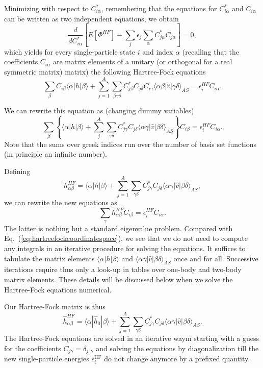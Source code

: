 \documentclass[graybox,sectrefs,envcountresetchap,open=right]{svmonodo}
\begin{document}
Minimizing with respect to $C^*_{i\alpha}$, remembering that the equations for $C^*_{i\alpha}$ and $C_{i\alpha}$
can be written as two  independent equations, we obtain
\[
\frac{d}{dC^*_{i\alpha}}\left[  E[\Phi^{HF}] - \sum_{j}\epsilon_j\sum_{\alpha} C^*_{j\alpha}C_{j\alpha}\right]=0,
\]
which yields for every single-particle state $i$ and index $\alpha$ (recalling that the coefficients $C_{i\alpha}$ are matrix elements of a unitary (or orthogonal for a real symmetric matrix) matrix)
the following Hartree-Fock equations
\[
\sum_{\beta} C_{i\beta}\langle \alpha | h | \beta \rangle+
\sum_{j=1}^A\sum_{\beta\gamma\delta} C^*_{j\beta}C_{j\delta}C_{i\gamma}\langle \alpha\beta|\hat{v}|\gamma\delta\rangle_{AS}=\epsilon_i^{HF}C_{i\alpha}.
\]



We can rewrite this equation as (changing dummy variables)
\[
\sum_{\beta} \left\{\langle \alpha | h | \beta \rangle+
\sum_{j}^A\sum_{\gamma\delta} C^*_{j\gamma}C_{j\delta}\langle \alpha\gamma|\hat{v}|\beta\delta\rangle_{AS}\right\}C_{i\beta}=\epsilon_i^{HF}C_{i\alpha}.
\]
Note that the sums over greek indices run over the number of basis set functions (in principle an infinite number).

Defining 
\[
h_{\alpha\beta}^{HF}=\langle \alpha | h | \beta \rangle+
\sum_{j=1}^A\sum_{\gamma\delta} C^*_{j\gamma}C_{j\delta}\langle \alpha\gamma|\hat{v}|\beta\delta\rangle_{AS},
\]
we can rewrite the new equations as 
\begin{equation}
\sum_{\gamma}h_{\alpha\beta}^{HF}C_{i\beta}=\epsilon_i^{HF}C_{i\alpha}. \label{eq:newhf}
\end{equation}
The latter is nothing but a standard eigenvalue problem. Compared with Eq.~(\ref{eq:hartreefockcoordinatespace}),
we see that we do not need to compute any integrals in an iterative procedure for solving the equations.
It suffices to tabulate the matrix elements $\langle \alpha | h | \beta \rangle$ and $\langle \alpha\gamma|\hat{v}|\beta\delta\rangle_{AS}$ once and for all. Successive iterations require thus only a look-up in tables over one-body and two-body matrix elements. These details will be discussed below when we solve the Hartree-Fock equations numerical. 



Our Hartree-Fock matrix  is thus
\[
\hat{h}_{\alpha\beta}^{HF}=\langle \alpha | \hat{h}_0 | \beta \rangle+
\sum_{j=1}^A\sum_{\gamma\delta} C^*_{j\gamma}C_{j\delta}\langle \alpha\gamma|\hat{v}|\beta\delta\rangle_{AS}.
\]
The Hartree-Fock equations are solved in an iterative waym starting with a guess for the coefficients $C_{j\gamma}=\delta_{j,\gamma}$ and solving the equations by diagonalization till the new single-particle energies
$\epsilon_i^{\mathrm{HF}}$ do not change anymore by a prefixed quantity. 
\end{document}
